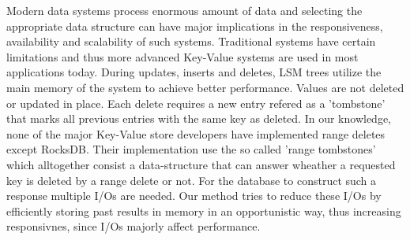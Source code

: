 Modern data systems process enormous amount of data and selecting the appropriate data structure can have major implications in the responsiveness, availability and scalability of such systems. 
Traditional systems have certain limitations and thus more advanced Key-Value systems are used in most applications today. 
During updates, inserts and deletes, LSM trees utilize the main memory of the system to achieve better performance. 
Values are not deleted or updated in place. 
Each delete requires a new entry refered as a 'tombstone' that marks all previous entries with the same key as deleted.
In our knowledge, none of the major Key-Value store developers have implemented range deletes except RocksDB.
Their implementation use the so called 'range tombstones' which alltogether consist a data-structure that can answer wheather a requested key is deleted by a range delete or not. 
For the database to construct such a response multiple I/Os are needed.
Our method tries to reduce these I/Os by efficiently storing past results in memory in an opportunistic way, thus increasing responsivnes, since I/Os majorly affect performance.
